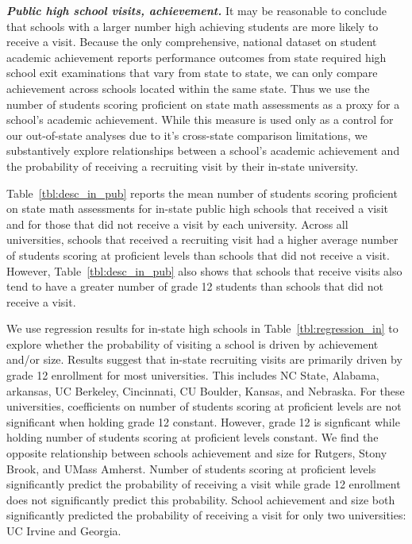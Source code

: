 \documentclass[twoside]{article}
\begin{document}
\textbf{\textit{Public high school visits, achievement.}} It may be reasonable to conclude that schools with a larger number high achieving students are more likely to receive a visit. Because the only comprehensive, national dataset on student academic achievement reports performance outcomes from state required high school exit examinations that vary from state to state, we can only compare achievement across schools located within the same state. Thus we use the number of students scoring proficient on state math assessments as a proxy for a school's academic achievement. While this measure is used only as a control for our out-of-state analyses due to it's cross-state comparison limitations, we substantively explore relationships between a school's academic achievement and the probability of receiving a recruiting visit by their in-state university.

Table~\ref{tbl:desc_in_pub} reports the mean number of students scoring proficient on state math assessments for in-state public high schools that received a visit and for those that did not receive a visit by each university. Across all universities, schools that received a recruiting visit had a higher average number of students scoring at proficient levels than schools that did not receive a visit. However, Table~\ref{tbl:desc_in_pub} also shows that schools that receive visits also tend to have a greater number of grade 12 students than schools that did not receive a visit.

We use regression results for in-state high schools in Table~\ref{tbl:regression_in} to explore whether the probability of visiting a school is driven by achievement and/or size. Results suggest that in-state recruiting visits are primarily driven by grade 12 enrollment for most universities. This includes NC State, Alabama, arkansas, UC Berkeley, Cincinnati, CU Boulder, Kansas, and Nebraska. For these universities, coefficients on number of students scoring at proficient levels are not significant when holding grade 12 constant. However,  grade 12 is signficant while holding number of students scoring at proficient levels constant. We find the opposite relationship between schools achievement and size for Rutgers, Stony Brook, and UMass Amherst. Number of students scoring at proficient levels significantly predict the probability of receiving a visit while grade 12 enrollment does not significantly predict this probability. School achievement and size both significantly predicted the probability of receiving a visit for only two universities: UC Irvine and Georgia.
\end{document}
